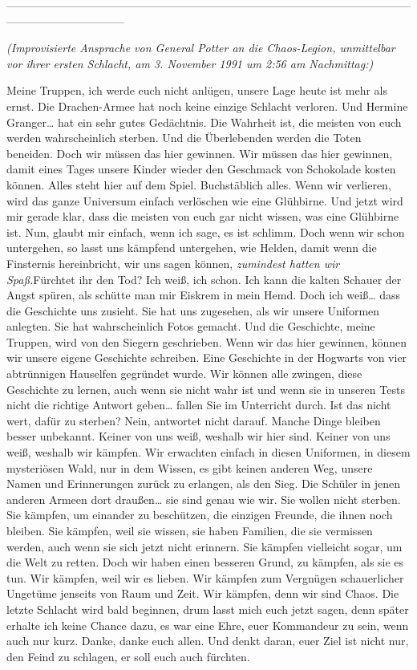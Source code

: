 {--------------------------------------------------------------------------------------------------------------------------------------------

\emph{(Improvisierte Ansprache von General Potter an die Chaos-Legion, unmittelbar vor ihrer ersten Schlacht, am 3. November 1991 um 2:56 am Nachmittag:)}

Meine Truppen, ich werde euch nicht anlügen, unsere Lage heute ist mehr als ernst. Die Drachen-Armee hat noch keine einzige Schlacht verloren. Und Hermine Granger… hat ein sehr gutes Gedächtnis. Die Wahrheit ist, die meisten von euch werden wahrscheinlich sterben. Und die Überlebenden werden die Toten beneiden. Doch wir müssen das hier gewinnen. Wir müssen das hier gewinnen, damit eines Tages unsere Kinder wieder den Geschmack von Schokolade kosten können. Alles steht hier auf dem Spiel. Buchstäblich alles. Wenn wir verlieren, wird das ganze Universum einfach verlöschen wie eine Glühbirne. Und jetzt wird mir gerade klar, dass die meisten von euch gar nicht wissen, was eine Glühbirne ist. Nun, glaubt mir einfach, wenn ich sage, es ist schlimm. Doch wenn wir schon untergehen, so lasst uns kämpfend untergehen, wie Helden, damit wenn die Finsternis hereinbricht, wir uns sagen können, \emph{zumindest hatten wir Spaß.}Fürchtet ihr den Tod? Ich weiß, ich schon. Ich kann die kalten Schauer der Angst spüren, als schütte man mir Eiskrem in mein Hemd. Doch ich weiß… dass die Geschichte uns zusieht. Sie hat uns zugesehen, als wir unsere Uniformen anlegten. Sie hat wahrscheinlich Fotos gemacht. Und die Geschichte, meine Truppen, wird von den Siegern geschrieben. Wenn wir das hier gewinnen, können wir unsere eigene Geschichte schreiben. Eine Geschichte in der Hogwarts von vier abtrünnigen Hauselfen gegründet wurde. Wir können alle zwingen, diese Geschichte zu lernen, auch wenn sie nicht wahr ist und wenn sie in unseren Tests nicht die richtige Antwort geben… fallen Sie im Unterricht durch. Ist das nicht wert, dafür zu sterben? Nein, antwortet nicht darauf. Manche Dinge bleiben besser unbekannt. Keiner von uns weiß, weshalb wir hier sind. Keiner von uns weiß, weshalb wir kämpfen. Wir erwachten einfach in diesen Uniformen, in diesem mysteriösen Wald, nur in dem Wissen, es gibt keinen anderen Weg, unsere Namen und Erinnerungen zurück zu erlangen, als den Sieg. Die Schüler in jenen anderen Armeen dort draußen… sie sind genau wie wir. Sie wollen nicht sterben. Sie kämpfen, um einander zu beschützen, die einzigen Freunde, die ihnen noch bleiben. Sie kämpfen, weil sie wissen, sie haben Familien, die sie vermissen werden, auch wenn sie sich jetzt nicht erinnern. Sie kämpfen vielleicht sogar, um die Welt zu retten. Doch wir haben einen besseren Grund, zu kämpfen, als sie es tun. Wir kämpfen, weil wir es lieben. Wir kämpfen zum Vergnügen schauerlicher Ungetüme jenseits von Raum und Zeit. Wir kämpfen, denn wir sind Chaos. Die letzte Schlacht wird bald beginnen, drum lasst mich euch jetzt sagen, denn später erhalte ich keine Chance dazu, es war eine Ehre, euer Kommandeur zu sein, wenn auch nur kurz. Danke, danke euch allen. Und denkt daran, euer Ziel ist nicht nur, den Feind zu schlagen, er soll euch auch fürchten.

}
